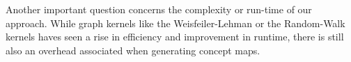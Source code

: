 Another important question concerns the complexity or run-time of our approach.
While graph kernels like the Weisfeiler-Lehman or the Random-Walk kernels haves seen a rise in efficiency and improvement in runtime, there is still also an overhead associated when generating concept maps.